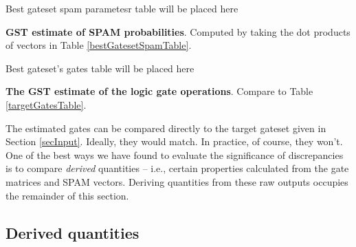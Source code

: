 \documentclass{article}[11pt]
\newcommand{\putfield}[2]{#2}
\begin{document}
\begin{table}[h]
\begin{center}
\putfield{bestGatesetSpamParametersTable}{Best gateset spam parametesr table will be placed here}
\caption{\putfield{tt_bestGatesetSpamParametersTable}{}\textbf{GST estimate of SPAM probabilities}.  Computed by taking the dot products of vectors in Table \ref{bestGatesetSpamTable}.\label{bestGatesetSpamParametersTable}}
\end{center}
\end{table}

\begin{table}[h]
\begin{center}
\putfield{bestGatesetGatesTable}{Best gateset's gates table will be placed here}
\caption{\putfield{tt_bestGatesetGatesTable}{}\textbf{The GST estimate of the logic gate operations}.  Compare to Table \ref{targetGatesTable}.\label{bestGatesetGatesTable}}
\end{center}
\end{table}

The estimated gates can be compared directly to the target gateset given in Section \ref{secInput}.  Ideally, they would match.  In practice, of course, they won't.  One of the best ways we have found to evaluate the significance of discrepancies is to compare \emph{derived} quantities -- i.e., certain properties calculated from the gate matrices and SPAM vectors.  Deriving quantities from these raw outputs occupies the remainder of this section.

\subsection{Derived quantities\label{derivedQtySection}}
\end{document}
